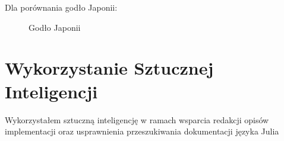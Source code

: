 \documentclass[12pt,a4paper]{article}
\begin{document}
\begin{center}
\end{center}


Dla porównania godło Japonii:

\begin{center}
   \begin{figure}[H]
        \caption{Godło Japonii}
        \hspace*{0.20\textwidth}
        
        \label{rys:godlo}
    \end{figure} 
\end{center}



\section*{Wykorzystanie Sztucznej Inteligencji}
Wykorzystałem sztuczną inteligencję w ramach wsparcia redakcji opisów implementacji oraz usprawnienia przeszukiwania dokumentacji języka Julia
\end{document}

